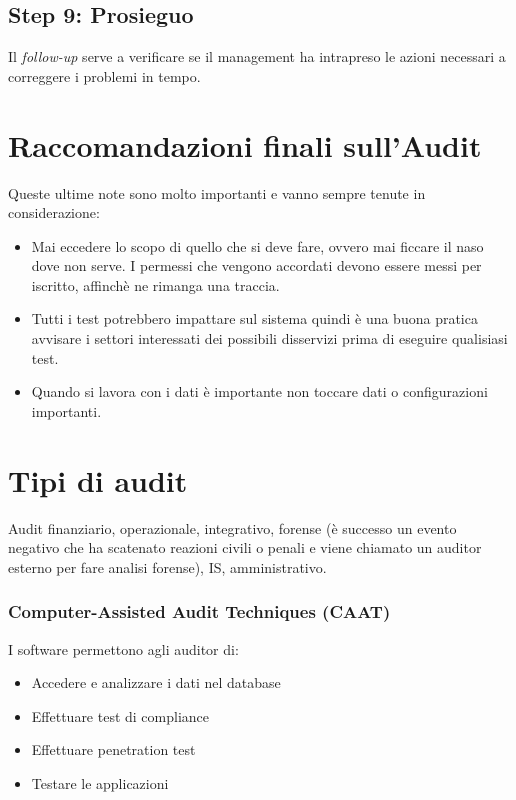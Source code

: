 \subsection{Step 9: Prosieguo}


Il \textit{follow-up} serve a verificare se il management ha intrapreso le azioni 
necessari a correggere i problemi in tempo.

\section{Raccomandazioni finali sull'Audit}

Queste ultime note sono molto importanti e vanno sempre tenute in
considerazione:
\begin{itemize}
\item Mai eccedere lo scopo di quello che si deve fare, ovvero mai ficcare il
naso dove non serve. I permessi che vengono accordati devono essere messi per
iscritto, affinchè ne rimanga una traccia.
\item Tutti i test potrebbero impattare sul sistema quindi è una buona
pratica avvisare i settori interessati dei possibili disservizi prima di eseguire 
qualisiasi test.
\item Quando si lavora con i dati è importante non toccare dati o configurazioni
importanti.
\end{itemize}


\section{Tipi di audit}

Audit finanziario, operazionale, integrativo, forense (è successo un evento
negativo che ha scatenato reazioni civili o penali e viene chiamato un auditor
esterno per fare analisi forense), IS, amministrativo.

\subsubsection{Computer-Assisted Audit Techniques (CAAT)}

I software permettono agli auditor di:
\begin{itemize}
\item Accedere e analizzare i dati nel database
\item Effettuare test di compliance
\item Effettuare penetration test
\item Testare le applicazioni
\end{itemize}


